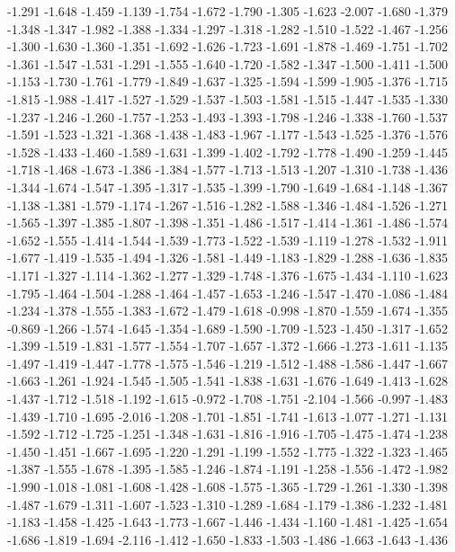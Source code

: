 \documentclass[9pt]{article}
\theoremstyle{plain}
\theoremstyle{definition}
\theoremstyle{remark}
\numberwithin{equation}{section}
\begin{document}
-1.291
-1.648
-1.459
-1.139
-1.754
-1.672
-1.790
-1.305
-1.623
-2.007
-1.680
-1.379
-1.348
-1.347
-1.982
-1.388
-1.334
-1.297
-1.318
-1.282
-1.510
-1.522
-1.467
-1.256
-1.300
-1.630
-1.360
-1.351
-1.692
-1.626
-1.723
-1.691
-1.878
-1.469
-1.751
-1.702
-1.361
-1.547
-1.531
-1.291
-1.555
-1.640
-1.720
-1.582
-1.347
-1.500
-1.411
-1.500
-1.153
-1.730
-1.761
-1.779
-1.849
-1.637
-1.325
-1.594
-1.599
-1.905
-1.376
-1.715
-1.815
-1.988
-1.417
-1.527
-1.529
-1.537
-1.503
-1.581
-1.515
-1.447
-1.535
-1.330
-1.237
-1.246
-1.260
-1.757
-1.253
-1.493
-1.393
-1.798
-1.246
-1.338
-1.760
-1.537
-1.591
-1.523
-1.321
-1.368
-1.438
-1.483
-1.967
-1.177
-1.543
-1.525
-1.376
-1.576
-1.528
-1.433
-1.460
-1.589
-1.631
-1.399
-1.402
-1.792
-1.778
-1.490
-1.259
-1.445
-1.718
-1.468
-1.673
-1.386
-1.384
-1.577
-1.713
-1.513
-1.207
-1.310
-1.738
-1.436
-1.344
-1.674
-1.547
-1.395
-1.317
-1.535
-1.399
-1.790
-1.649
-1.684
-1.148
-1.367
-1.138
-1.381
-1.579
-1.174
-1.267
-1.516
-1.282
-1.588
-1.346
-1.484
-1.526
-1.271
-1.565
-1.397
-1.385
-1.807
-1.398
-1.351
-1.486
-1.517
-1.414
-1.361
-1.486
-1.574
-1.652
-1.555
-1.414
-1.544
-1.539
-1.773
-1.522
-1.539
-1.119
-1.278
-1.532
-1.911
-1.677
-1.419
-1.535
-1.494
-1.326
-1.581
-1.449
-1.183
-1.829
-1.288
-1.636
-1.835
-1.171
-1.327
-1.114
-1.362
-1.277
-1.329
-1.748
-1.376
-1.675
-1.434
-1.110
-1.623
-1.795
-1.464
-1.504
-1.288
-1.464
-1.457
-1.653
-1.246
-1.547
-1.470
-1.086
-1.484
-1.234
-1.378
-1.555
-1.383
-1.672
-1.479
-1.618
-0.998
-1.870
-1.559
-1.674
-1.355
-0.869
-1.266
-1.574
-1.645
-1.354
-1.689
-1.590
-1.709
-1.523
-1.450
-1.317
-1.652
-1.399
-1.519
-1.831
-1.577
-1.554
-1.707
-1.657
-1.372
-1.666
-1.273
-1.611
-1.135
-1.497
-1.419
-1.447
-1.778
-1.575
-1.546
-1.219
-1.512
-1.488
-1.586
-1.447
-1.667
-1.663
-1.261
-1.924
-1.545
-1.505
-1.541
-1.838
-1.631
-1.676
-1.649
-1.413
-1.628
-1.437
-1.712
-1.518
-1.192
-1.615
-0.972
-1.708
-1.751
-2.104
-1.566
-0.997
-1.483
-1.439
-1.710
-1.695
-2.016
-1.208
-1.701
-1.851
-1.741
-1.613
-1.077
-1.271
-1.131
-1.592
-1.712
-1.725
-1.251
-1.348
-1.631
-1.816
-1.916
-1.705
-1.475
-1.474
-1.238
-1.450
-1.451
-1.667
-1.695
-1.220
-1.291
-1.199
-1.552
-1.775
-1.322
-1.323
-1.465
-1.387
-1.555
-1.678
-1.395
-1.585
-1.246
-1.874
-1.191
-1.258
-1.556
-1.472
-1.982
-1.990
-1.018
-1.081
-1.608
-1.428
-1.608
-1.575
-1.365
-1.729
-1.261
-1.330
-1.398
-1.487
-1.679
-1.311
-1.607
-1.523
-1.310
-1.289
-1.684
-1.179
-1.386
-1.232
-1.481
-1.183
-1.458
-1.425
-1.643
-1.773
-1.667
-1.446
-1.434
-1.160
-1.481
-1.425
-1.654
-1.686
-1.819
-1.694
-2.116
-1.412
-1.650
-1.833
-1.503
-1.486
-1.663
-1.643
-1.436
\end{document}
